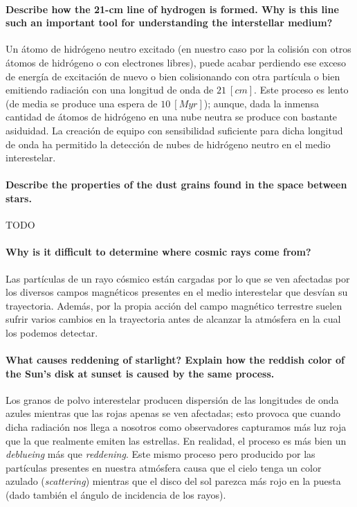 \documentclass{tufte-handout}
\begin{document}
\paragraph{\textbf{Describe how the 21-cm line of hydrogen is formed. Why is this line such an important tool for
understanding the interstellar medium?}}

Un átomo de hidrógeno neutro excitado (en nuestro caso por la colisión con otros átomos de hidrógeno o con electrones libres), puede acabar perdiendo ese exceso de energía de excitación de nuevo o bien colisionando con otra partícula o bien emitiendo radiación con una longitud de onda de $21~[cm]$. Este proceso es lento (de media se produce una espera de $10~[Myr]$); aunque, dada la inmensa cantidad de átomos de hidrógeno en una nube neutra se produce con bastante asiduidad. La creación de equipo con sensibilidad suficiente para dicha longitud de onda ha permitido la detección de nubes de hidrógeno neutro en el medio interestelar.

\paragraph{\textbf{Describe the properties of the dust grains found in the space between stars.}}

TODO

\paragraph{\textbf{Why is it difficult to determine where cosmic rays come from?}}

Las partículas de un rayo cósmico están cargadas por lo que se ven afectadas por los diversos campos magnéticos presentes en el medio interestelar que desvían su trayectoria. Además, por la propia acción del campo magnético terrestre suelen sufrir varios cambios en la trayectoria antes de alcanzar la atmósfera en la cual los podemos detectar.

\paragraph{\textbf{What causes reddening of starlight? Explain how the reddish color of the Sun’s disk at sunset is caused by
the same process.}}

Los granos de polvo interestelar producen dispersión de las longitudes de onda azules mientras que las rojas apenas se ven afectadas; esto provoca que cuando dicha radiación nos llega a nosotros como observadores capturamos más luz roja que la que realmente emiten las estrellas. En realidad, el proceso es más bien un \emph{deblueing} más que \emph{reddening}. Este mismo proceso pero producido por las partículas presentes en nuestra atmósfera causa que el cielo tenga un color azulado (\emph{scattering}) mientras que el disco del sol parezca más rojo en la puesta (dado también el ángulo de incidencia de los rayos).
\end{document}

